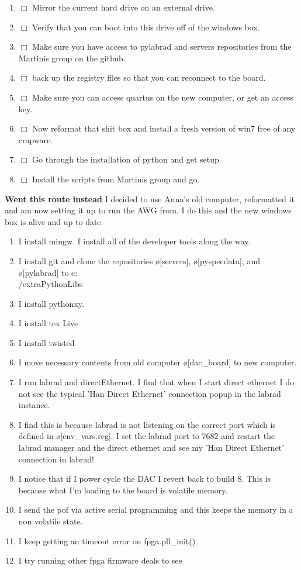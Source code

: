 \documentclass[10pt]{book}
\begin{document}
\begin{enumerate}
    \item $\Box$ Mirror the current hard drive on an external drive.
    \item $\Box$ Verify that you can boot into this drive off of the windows box.
    \item $\Box$ Make sure you have access to pylabrad and servers repositories from the Martinis group on the github. 
    \item $\Box$ back up the registry files so that you can reconnect to the board.
    \item $\Box$ Make sure you can access quartus on the new computer, or get an access key.
    \item $\Box$ Now reformat that shit box and install a fresh version of win7 free of any crapware.
    \item $\Box$ Go through the installation of python and get setup.
    \item $\Box$ Install the scripts from Martinis group and go.\\
\end{enumerate}

{\bf Went this route instead}
I decided to use Anna's old computer, reformatted it and am now setting it up to run the AWG from. I do this and the new windows box is alive and up to date.
\begin{enumerate}
    \item I install mingw. I install all of the developer tools along the way.
    \item I install git and clone the repositories \o[servers]{}, \o[pyspecdata]{}, and \o[pylabrad]{} to c:\\/extraPythonLibs
    \item I install pythonxy.
    \item I install tex Live
    \item I install twisted
    \item I move necessary contents from old computer \o[dac\_board]{} to new computer.
    \item I run labrad and directEthernet. I find that when I start direct ethernet I do not see the typical 'Han Direct Ethernet' connection popup in the labrad instance.
    \item I find this is because labrad is not listening on the correct port which is defined in \o[env\_vars.reg]{}. I set the labrad port to 7682 and restart the labrad manager and the direct ethernet and see my 'Han Direct Ethernet' connection in labrad!
    \item I notice that if I power cycle the DAC I revert back to build 8. This is because what I'm loading to the board is volatile memory.
    \item I send the pof via active serial programming and this keeps the memory in a non volatile state.
    \item I keep getting an timeout error on fpga.pll\_init()
    \item I try running other fpga firmware deals to see 
\end{enumerate}
\end{document}
